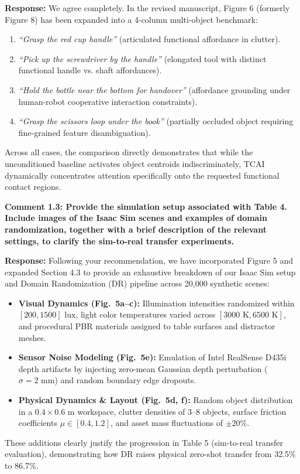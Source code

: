 \documentclass[11pt]{article}
\newcommand{\reviewercomment}[1]{\vspace{1.8ex}\noindent\textbf{\textcolor{revcolor}{#1}}}
\newcommand{\response}{\vspace{1ex}\noindent\textbf{Response: }}
\begin{document}
\response
We agree completely. In the revised manuscript, Figure 6 (formerly Figure 8) has been expanded into a 4-column multi-object benchmark:
\begin{enumerate}[leftmargin=*]
    \item \textit{``Grasp the red cup handle''} (articulated functional affordance in clutter).
    \item \textit{``Pick up the screwdriver by the handle''} (elongated tool with distinct functional handle vs. shaft affordances).
    \item \textit{``Hold the bottle near the bottom for handover''} (affordance grounding under human-robot cooperative interaction constraints).
    \item \textit{``Grasp the scissors loop under the book''} (partially occluded object requiring fine-grained feature disambiguation).
\end{enumerate}
Across all cases, the comparison directly demonstrates that while the unconditioned baseline activates object centroids indiscriminately, TCAI dynamically concentrates attention specifically onto the requested functional contact regions.

\reviewercomment{Comment 1.3: Provide the simulation setup associated with Table 4. Include images of the Isaac Sim scenes and examples of domain randomization, together with a brief description of the relevant settings, to clarify the sim-to-real transfer experiments.}

\response
Following your recommendation, we have incorporated Figure 5 and expanded Section 4.3 to provide an exhaustive breakdown of our Isaac Sim setup and Domain Randomization (DR) pipeline across 20,000 synthetic scenes:
\begin{itemize}[leftmargin=*]
    \item \textbf{Visual Dynamics (Fig.~5a--c):} Illumination intensities randomized within $[200, 1500]\text{ lux}$, light color temperatures varied across $[3000\text{ K}, 6500\text{ K}]$, and procedural PBR materials assigned to table surfaces and distractor meshes.
    \item \textbf{Sensor Noise Modeling (Fig.~5e):} Emulation of Intel RealSense D435i depth artifacts by injecting zero-mean Gaussian depth perturbation ($\sigma = 2\text{ mm}$) and random boundary edge dropouts.
    \item \textbf{Physical Dynamics \& Layout (Fig.~5d, f):} Random object distribution in a $0.4 \times 0.6\text{ m}$ workspace, clutter densities of 3--8 objects, surface friction coefficients $\mu \in [0.4, 1.2]$, and asset mass fluctuations of $\pm 20\%$.
\end{itemize}
These additions clearly justify the progression in Table 5 (sim-to-real transfer evaluation), demonstrating how DR raises physical zero-shot transfer from 32.5\% to 86.7\%.
\end{document}
